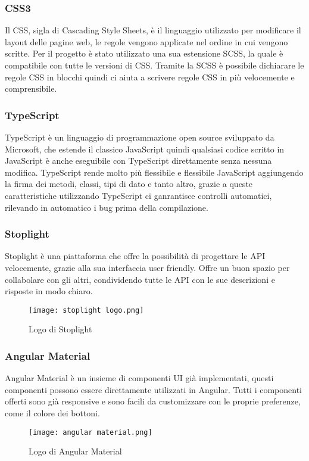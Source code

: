\subsubsection{CSS3}
Il CSS, sigla di Cascading Style Sheets, è il linguaggio utilizzato per modificare il layout delle pagine web, le regole vengono applicate nel ordine in cui vengono scritte. Per il progetto è stato utilizzato una sua estensione SCSS, la quale è compatibile con tutte le versioni di CSS. Tramite la SCSS è possibile dichiarare le regole CSS in blocchi quindi ci aiuta a scrivere regole CSS in più velocemente e comprensibile.
\subsubsection{TypeScript}
TypeScript è un linguaggio di programmazione open source sviluppato da Microsoft, che estende il classico JavaScript quindi qualsiasi codice scritto in JavaScript è anche eseguibile con TypeScript direttamente senza nessuna modifica. TypeScript rende molto più flessibile e flessibile JavaScript aggiungendo la firma dei metodi, classi, tipi di dato e tanto altro, grazie a queste caratteristiche utilizzando TypeScript ci ganrantisce controlli automatici, rilevando in automatico i bug prima della compilazione.
\subsubsection{Stoplight}
Stoplight è una piattaforma che offre la possibilità di progettare le API velocemente, grazie alla sua interfaccia user friendly. Offre un buon spazio per collabolare con gli altri, condividendo tutte le API con le sue descrizioni e risposte in modo chiaro.
\begin{figure}[H]
    \centering
    \texttt{[image: stoplight logo.png]}
    \caption{Logo di Stoplight}
\end{figure}
\subsubsection{Angular Material}
Angular Material è un insieme di componenti UI già implementati, questi componenti possono essere direttamente utilizzati in Angular. Tutti i componenti offerti sono già responsive e sono facili da customizzare con le proprie preferenze, come il colore dei bottoni.
\begin{figure}[H]
    \centering
    \texttt{[image: angular material.png]}
    \caption{Logo di Angular Material}
\end{figure}

